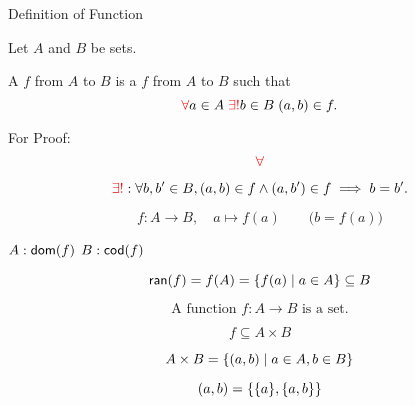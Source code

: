 \begin{frame}{}
  \begin{center}
    {\LARGE Definition of Function}
  \end{center}
\end{frame}

\begin{frame}{}

\end{frame}

\begin{frame}{}
\end{frame}

\begin{frame}{}
\end{frame}

\begin{frame}{}
  \begin{definition}[Function]
    Let $A$ and $B$ be sets.

    A  $f$ from $A$ to $B$ is a  $f$ from $A$ to $B$ such that
    \[
      \textcolor{red}{\forall} a \in A\; \textcolor{red}{\exists!} b \in B\; (a, b) \in f.
    \]
  \end{definition}

  \pause
  \begin{alertblock}{For Proof:}
    \[
      \textcolor{red}{\forall}
    \]

    \[
      \textcolor{red}{\exists!}: \forall b, b' \in B, (a, b) \in f \land (a, b') \in f \implies b = b'.
    \]
  \end{alertblock}

  \pause
  \[
    f: A \to B, \quad a \mapsto f(a) \qquad\Big(b = f(a)\Big)
  \]

  \centerline{$A: \textsf{dom}(f)$ \qquad $B: \textsf{cod}(f)$}

  \pause
  \[
    \textsf{ran}(f) = f(A) = \{f(a) \mid a \in A\} \subseteq B
  \]
\end{frame}

\begin{frame}{}
  \[
    \text{A function } f: A \to B \text{ is a set.}
  \]

  \[
    f \subseteq A \times B
  \]

  \[
    A \times B = \{(a,b) \mid a \in A, b \in B\}
  \]

  \[
    (a,b) = \{\{a\}, \{a,b\}\}
  \]
\end{frame}

